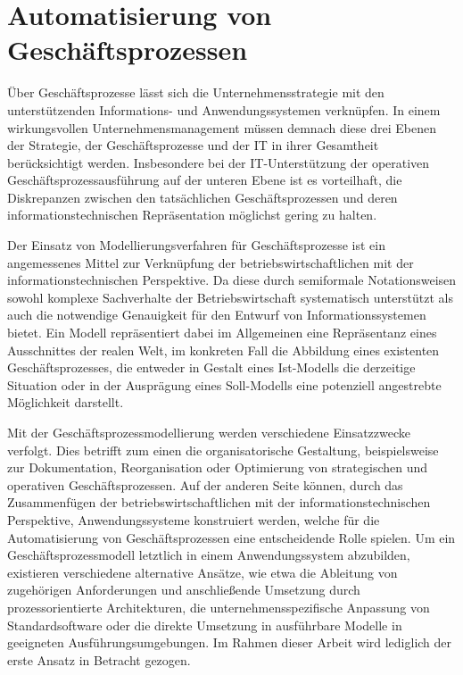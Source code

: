 \section{Automatisierung von Geschäftsprozessen}\label{sec:Automatisierung}
Über Geschäftsprozesse lässt sich die Unternehmensstrategie mit den unterstützenden Informations- und Anwendungssystemen verknüpfen.
In einem wirkungsvollen Unternehmensmanagement müssen demnach diese drei Ebenen der Strategie, der Geschäftsprozesse und der \ac{IT} in ihrer Gesamtheit berücksichtigt werden.
Insbesondere bei der \ac{IT}-Unterstützung der operativen Geschäftsprozessausführung auf der unteren Ebene ist es vorteilhaft, die Diskrepanzen zwischen den tatsächlichen Geschäftsprozessen und deren informationstechnischen Repräsentation möglichst gering zu halten.

Der Einsatz von Modellierungsverfahren für Geschäftsprozesse ist ein angemessenes Mittel zur Verknüpfung der betriebswirtschaftlichen mit der informationstechnischen Perspektive.
Da diese durch semiformale Notationsweisen sowohl komplexe Sachverhalte der Betriebswirtschaft systematisch unterstützt als auch die notwendige Genauigkeit für den Entwurf von Informationssystemen bietet.
Ein Modell repräsentiert dabei im Allgemeinen eine Repräsentanz eines Ausschnittes der realen Welt, im konkreten Fall die Abbildung eines existenten Geschäftsprozesses, die entweder in Gestalt eines Ist-Modells die derzeitige Situation oder in der Ausprägung eines Soll-Modells eine potenziell angestrebte Möglichkeit darstellt.

Mit der Geschäftsprozessmodellierung werden verschiedene Einsatzzwecke verfolgt.
Dies betrifft zum einen die organisatorische Gestaltung, beispielsweise zur Dokumentation, Reorganisation oder Optimierung von strategischen und operativen Geschäftsprozessen. 
Auf der anderen Seite können, durch das Zusammenfügen der betriebswirtschaftlichen mit der informationstechnischen Perspektive, Anwendungssysteme konstruiert werden, welche für die Automatisierung von Geschäftsprozessen eine entscheidende Rolle spielen.
Um ein Geschäftsprozessmodell letztlich in einem Anwendungssystem abzubilden, existieren verschiedene alternative Ansätze, wie etwa die Ableitung von zugehörigen Anforderungen und anschließende Umsetzung durch prozessorientierte Architekturen, die unternehmensspezifische Anpassung von Standardsoftware oder die direkte Umsetzung in ausführbare Modelle in geeigneten Ausführungsumgebungen.
Im Rahmen dieser Arbeit wird lediglich der erste Ansatz in Betracht gezogen.

